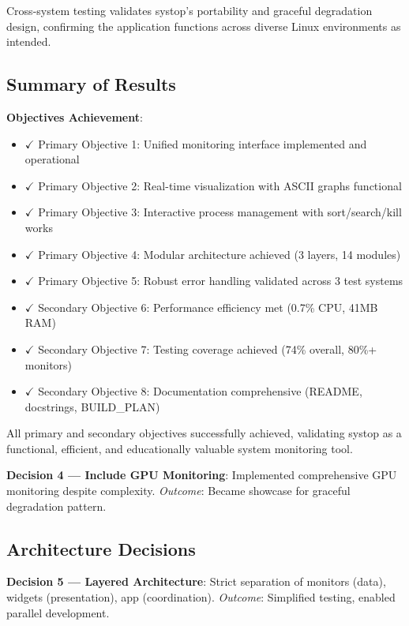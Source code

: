\documentclass[12pt,a4paper,oneside]{report}
\begin{document}
Cross-system testing validates systop's portability and graceful degradation design, confirming the application functions across diverse Linux environments as intended.

\subsection{Summary of Results}

\textbf{Objectives Achievement}:
\begin{itemize}
    \item $\checkmark$ Primary Objective 1: Unified monitoring interface implemented and operational
    \item $\checkmark$ Primary Objective 2: Real-time visualization with ASCII graphs functional
    \item $\checkmark$ Primary Objective 3: Interactive process management with sort/search/kill works
    \item $\checkmark$ Primary Objective 4: Modular architecture achieved (3 layers, 14 modules)
    \item $\checkmark$ Primary Objective 5: Robust error handling validated across 3 test systems
    \item $\checkmark$ Secondary Objective 6: Performance efficiency met (0.7\% CPU, 41MB RAM)
    \item $\checkmark$ Secondary Objective 7: Testing coverage achieved (74\% overall, 80\%+ monitors)
    \item $\checkmark$ Secondary Objective 8: Documentation comprehensive (README, docstrings, BUILD\_PLAN)
\end{itemize}

All primary and secondary objectives successfully achieved, validating systop as a functional, efficient, and educationally valuable system monitoring tool.

\textbf{Decision 4 --- Include GPU Monitoring}: Implemented comprehensive GPU monitoring despite complexity. \textit{Outcome}: Became showcase for graceful degradation pattern.

\subsection{Architecture Decisions}

\textbf{Decision 5 --- Layered Architecture}: Strict separation of monitors (data), widgets (presentation), app (coordination). \textit{Outcome}: Simplified testing, enabled parallel development.
\end{document}
